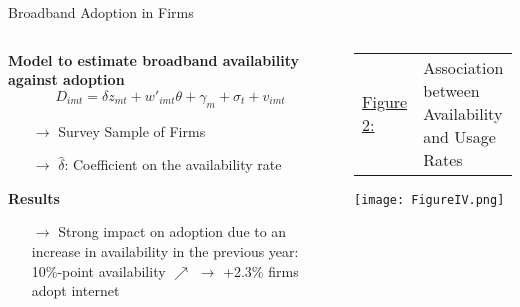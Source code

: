 \documentclass[compress, aspectratio=169, xcolor=dvipsnames]{beamer}
\begin{document}
\begin{frame}{Broadband Adoption in Firms}

\begin{columns}

\begin{column}{0.6\textwidth}

	\textbf{Model to estimate broadband availability against adoption}
\begin{equation*}
	D_{imt} = \delta z_{mt} + w'_{imt} \theta + \gamma_m + \sigma_t + v_{imt}
\end{equation*}
\begin{itemize}
	\item[$\rightarrow$] Survey Sample of Firms 
	\item[$\rightarrow$] $\hat \delta$: Coefficient on the availability rate
\end{itemize}
\vspace{5pt}
\textbf{Results}
\begin{itemize}
	\item[$\rightarrow$] Strong impact on adoption due to an increase in availability in the previous year: 10\%-point availability $\nearrow$ $\rightarrow$ +2.3\% firms adopt internet
\end{itemize}

\end{column}

\begin{column}{0.4\textwidth}
	\centering
	\scriptsize{
	\begin{tabular}{l p{4cm}}
 	\underline{Figure 2:} & Association between Availability and Usage Rates
 	\end{tabular}}
 	\vspace{10pt}
 	
    \texttt{[image: FigureIV.png]}\qquad
    
\end{column}


\end{columns}	

\end{frame}
\end{document}
